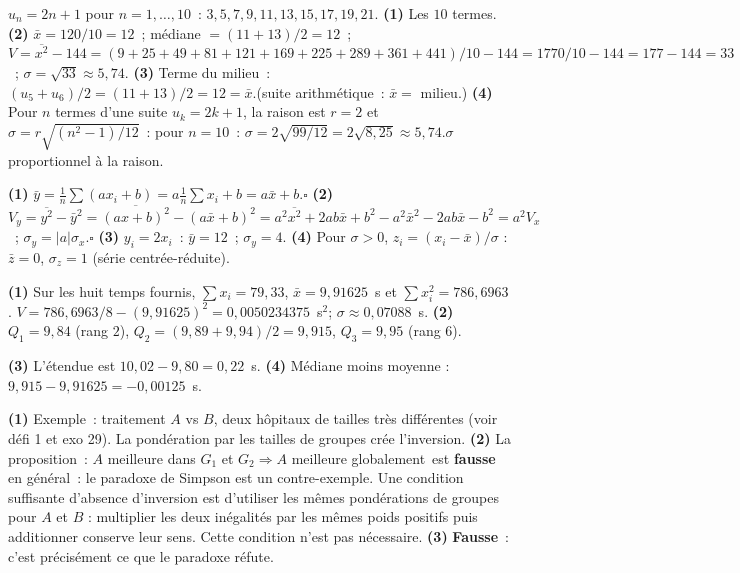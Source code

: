 
$u_n=2n+1$ pour $n=1,\ldots,10$~: $3,5,7,9,11,13,15,17,19,21$.
\textbf{(1)} Les $10$ termes.
\textbf{(2)} $\bar{x}=120/10=12$~; m\'ediane $=(11+13)/2=12$~;
$V=\overline{x^2}-144=(9+25+49+81+121+169+225+289+361+441)/10-144=1770/10-144=177-144=33$~; $\sigma=\sqrt{33}\approx5{,}74$.
\textbf{(3)} Terme du milieu~: $(u_5+u_6)/2=(11+13)/2=12=\bar{x}$.\checkmark (suite arithm\'etique~: $\bar{x}=$ milieu.)
\textbf{(4)} Pour $n$ termes d'une suite $u_k=2k+1$, la raison est $r=2$ et $\sigma=r\sqrt{(n^2-1)/12}$~:
pour $n=10$~: $\sigma=2\sqrt{99/12}=2\sqrt{8{,}25}\approx5{,}74$.\checkmark\quad $\sigma$ proportionnel \`a la raison.


\textbf{(1)} $\bar{y}=\frac{1}{n}\sum(ax_i+b)=a\frac{1}{n}\sum x_i+b=a\bar{x}+b$.\hfill$\square$
\textbf{(2)} $V_y=\overline{y^2}-\bar{y}^2=\overline{(ax+b)^2}-(a\bar{x}+b)^2
=a^2\overline{x^2}+2ab\bar{x}+b^2-a^2\bar{x}^2-2ab\bar{x}-b^2=a^2V_x$~;
$\sigma_y=|a|\sigma_x$.\hfill$\square$
\textbf{(3)} $y_i=2x_i$~: $\bar{y}=12$~; $\sigma_y=4$.
\textbf{(4)} Pour $\sigma>0$, $z_i=(x_i-\bar{x})/\sigma$ : $\bar{z}=0$, $\sigma_z=1$ (s\'erie centr\'ee-r\'eduite).


\textbf{(1)} Sur les huit temps fournis,
$\sum x_i=79{,}33$, $\bar x=9{,}91625$~s et $\sum x_i^2=786{,}6963$.
$V=786{,}6963/8-(9{,}91625)^2=0{,}0050234375$~s$^2$;
$\sigma\approx0{,}07088$~s.
\textbf{(2)} $Q_1=9{,}84$ (rang $2$),
$Q_2=(9{,}89+9{,}94)/2=9{,}915$, $Q_3=9{,}95$ (rang $6$).
\begin{center}\end{center}
\textbf{(3)} L'\'etendue est $10{,}02-9{,}80=0{,}22$~s.
\textbf{(4)} M\'ediane moins moyenne : $9{,}915-9{,}91625=-0{,}00125$~s.


\textbf{(1)} Exemple~: traitement $A$ vs $B$, deux h\^opitaux de tailles tr\`es diff\'erentes
(voir d\'efi 1 et exo 29). La pond\'eration par les tailles de groupes cr\'ee l'inversion.
\textbf{(2)} La proposition~: \og $A$ meilleure dans $G_1$ et $G_2\Rightarrow A$ meilleure globalement\fg\
est \textbf{fausse} en g\'en\'eral~: le paradoxe de Simpson est un contre-exemple.
Une condition suffisante d'absence d'inversion est d'utiliser les m\^emes
pond\'erations de groupes pour $A$ et $B$ : multiplier les deux in\'egalit\'es
par les m\^emes poids positifs puis additionner conserve leur sens.
Cette condition n'est pas n\'ecessaire.
\textbf{(3)} \textbf{Fausse}~: c'est pr\'ecis\'ement ce que le paradoxe r\'efute.


